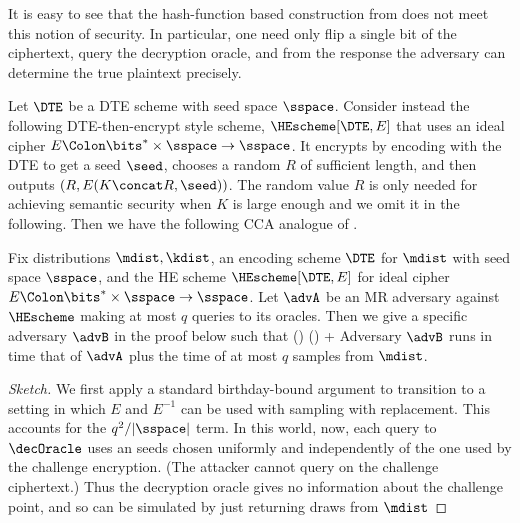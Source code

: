 It is easy to see that the hash-function based construction from \cite{JR14} does not meet
this notion of security. In particular, one need only flip a single bit of the ciphertext, 
query the decryption oracle, and from the response the adversary can determine the true 
plaintext precisely.

Let $\DTE$ be a DTE scheme with seed space $\sspace$.
Consider instead the following DTE-then-encrypt style scheme, $\HEscheme[\DTE,E]$ 
that uses an ideal cipher $E\Colon\bits^*\times\sspace\rightarrow\sspace$. 
It encrypts by encoding with the DTE to get a seed $\seed$, chooses a random $R$ of sufficient length, 
and then outputs $(R,E(K\concat R,\seed))$. The random value $R$ is only needed for achieving semantic security
when $K$ is large enough and we omit it in the following.
Then we have the following CCA analogue of .

\begin{theorem}
\label{thm:gen-cons}
Fix distributions $\mdist,\kdist$, an encoding scheme $\DTE$ for $\mdist$ with seed space $\sspace$,
and the HE scheme $\HEscheme[\DTE,E]$ for ideal cipher $E\Colon\bits^*\times\sspace\rightarrow\sspace$. 
Let $\advA$ be an MR adversary against $\HEscheme$ making at most $q$ queries to its oracles. 
Then we give a specific adversary $\advB$ in the proof below such that 
\bnm
  \AdvMRCCA{\HEscheme,\mdist,\kdist}(\advA)
    \;\le\; \AdvMR{\DTE,\mdist}(\advB) + 
\enm
Adversary $\advB$ runs in time that of $\advA$ plus the time of at most $q$ samples from $\mdist$.
\end{theorem}


\begin{proof}[Sketch]
We first apply a standard birthday-bound argument to transition to a setting in which $E$ and $E^{-1}$ 
can be used with sampling with replacement. This accounts for the $q^2/|\sspace|$ term. In this world, now,
each query to $\decOracle$ uses an seeds chosen uniformly and independently of the one used by the challenge
encryption. (The attacker cannot query on the challenge ciphertext.) Thus the decryption oracle gives no
information about the challenge point, and so can be simulated by just returning draws from $\mdist$
\end{proof}






